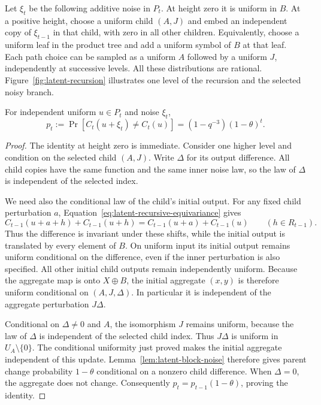 Let $\xi_t$ be the following additive noise in $P_t$.
At height zero it is uniform in $B$.  At a positive height, choose a
uniform child $(A,J)$ and embed an independent copy of $\xi_{t-1}$ in
that child, with zero in all other children.  Equivalently, choose a
uniform leaf in the product tree and add a uniform symbol of $B$ at that
leaf.  Each path choice can be sampled as a uniform $A$ followed by a
uniform $J$, independently at successive levels.  All these distributions
are rational. Figure~\ref{fig:latent-recursion} illustrates one level
of the recursion and the selected noisy branch.

\FloatBarrier

\begin{lemma}\label{lem:latent-noise}
For independent uniform $u\in P_t$ and noise $\xi_t$,
\begin{equation}\label{eq:latent-change-probability}
 p_t:=\Pr[C_t(u+\xi_t)\ne C_t(u)]
     =(1-q^{-3})(1-\theta)^t.
\end{equation}
\end{lemma}

\begin{proof}
The identity at height zero is immediate.  Consider one higher level and
condition on the selected child $(A,J)$.  Write $\Delta$ for its output
difference.  All child copies have the same function and the same inner
noise law, so the law of $\Delta$ is independent of the selected index.

We need also the conditional law of the child's initial output.
For any fixed child perturbation $a$, Equation~\eqref{eq:latent-recursive-equivariance}
gives
\[
 C_{t-1}(u+a+h)+C_{t-1}(u+h)
 =C_{t-1}(u+a)+C_{t-1}(u)
 \qquad(h\in R_{t-1}).
\]
Thus the difference is invariant under these shifts, while the initial
output is translated by every element of $B$.  On uniform input its
initial output remains uniform conditional on the difference, even if the
inner perturbation is also specified.  All other initial child outputs
remain independently uniform.  Because the aggregate map is onto
$X\oplus B$, the initial aggregate $(x,y)$ is therefore uniform
conditional on $(A,J,\Delta)$.  In particular it is independent of the
aggregate perturbation $J\Delta$.

Conditional on $\Delta\ne0$ and $A$, the isomorphism $J$ remains uniform,
because the law of $\Delta$ is independent of the selected child index.
Thus $J\Delta$ is uniform in $U_A\setminus\{0\}$.  The conditional
uniformity just proved makes the initial aggregate independent of this
update.  Lemma~\ref{lem:latent-block-noise} therefore gives parent change
probability $1-\theta$ conditional on a nonzero child difference.  When
$\Delta=0$, the aggregate does not change.  Consequently
$p_t=p_{t-1}(1-\theta)$, proving the identity.
\end{proof}

